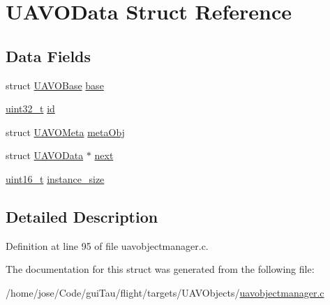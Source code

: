 \hypertarget{struct_u_a_v_o_data}{\section{U\-A\-V\-O\-Data Struct Reference}
\label{struct_u_a_v_o_data}
}
\subsection*{Data Fields}
\begin{DoxyCompactItemize}
\item 
struct \hyperlink{struct_u_a_v_o_base}{U\-A\-V\-O\-Base} \hyperlink{group___u_a_v_gacf898b0b5f95119ac33559f504c073cf}{base}
\item 
\hyperlink{stdint_8h_a435d1572bf3f880d55459d9805097f62}{uint32\-\_\-t} \hyperlink{group___u_a_v_gaead38a840ec3156c37871e121c202e40}{id}
\item 
struct \hyperlink{struct_u_a_v_o_meta}{U\-A\-V\-O\-Meta} \hyperlink{group___u_a_v_ga81dba5fc31f263dc85688f290703f9c5}{meta\-Obj}
\item 
struct \hyperlink{struct_u_a_v_o_data}{U\-A\-V\-O\-Data} $\ast$ \hyperlink{group___u_a_v_ga69aa4b26e0e8727f2e9a418f42d056a0}{next}
\item 
\hyperlink{stdint_8h_a273cf69d639a59973b6019625df33e30}{uint16\-\_\-t} \hyperlink{group___u_a_v_ga1ba7707e476478c92318fe6589e3dfd9}{instance\-\_\-size}
\end{DoxyCompactItemize}


\subsection{Detailed Description}


Definition at line 95 of file uavobjectmanager.\-c.



The documentation for this struct was generated from the following file\-:\begin{DoxyCompactItemize}
\item 
/home/jose/\-Code/gui\-Tau/flight/targets/\-U\-A\-V\-Objects/\hyperlink{uavobjectmanager_8c}{uavobjectmanager.\-c}\end{DoxyCompactItemize}
